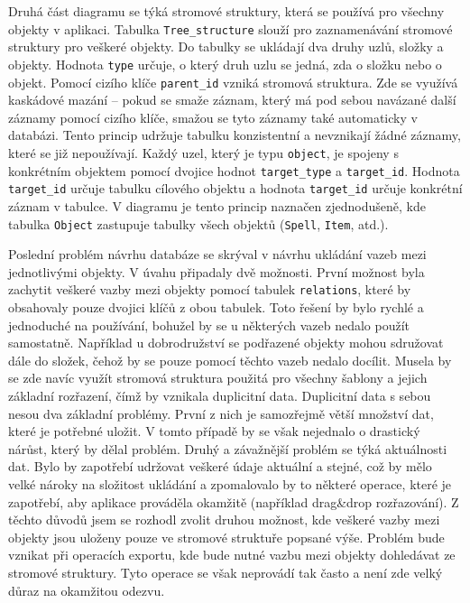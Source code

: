 \documentclass[thesis=B,czech]{resources/FITthesis}[2012/06/26]
\begin{document}
Druhá část diagramu se týká stromové struktury, která se používá pro všechny objekty v aplikaci. Tabulka \texttt{Tree\_structure} slouží pro zaznamenávání stromové struktury pro veškeré objekty. Do tabulky se ukládají dva druhy uzlů, složky a objekty. Hodnota \texttt{type} určuje, o který druh uzlu se jedná, zda o složku nebo o objekt. Pomocí cizího klíče \texttt{parent\_id} vzniká stromová struktura. Zde se využívá kaskádové mazání -- pokud se smaže záznam, který má pod sebou navázané další záznamy pomocí cizího klíče, smažou se tyto záznamy také automaticky v databázi. Tento princip udržuje tabulku konzistentní a nevznikají žádné záznamy, které se již nepoužívají. Každý uzel, který je typu \texttt{object}, je spojeny s konkrétním objektem pomocí dvojice hodnot \texttt{target\_type} a \texttt{target\_id}. Hodnota \texttt{target\_id} určuje tabulku cílového objektu a hodnota \texttt{target\_id} určuje konkrétní záznam v tabulce. V diagramu je tento princip naznačen zjednodušeně, kde tabulka \texttt{Object} zastupuje tabulky všech objektů (\texttt{Spell}, \texttt{Item}, atd.). \par

Poslední problém návrhu databáze se skrýval v návrhu ukládání vazeb mezi jednotlivými objekty. V úvahu připadaly dvě možnosti. První možnost byla zachytit veškeré vazby mezi objekty pomocí tabulek \texttt{relations}, které by obsahovaly pouze dvojici klíčů z obou tabulek. Toto řešení by bylo rychlé a jednoduché na používání, bohužel by se u některých vazeb nedalo použít samostatně. Například u dobrodružství se podřazené objekty mohou sdružovat dále do složek, čehož by se pouze pomocí těchto vazeb nedalo docílit. Musela by se zde navíc využít stromová struktura použitá pro všechny šablony a jejich základní rozřazení, čímž by vznikala duplicitní data. Duplicitní data s sebou nesou dva základní problémy. První z nich je samozřejmě větší množství dat, které je potřebné uložit. V tomto případě by se však nejednalo o drastický nárůst, který by dělal problém. Druhý a závažnější problém se týká aktuálnosti dat. Bylo by zapotřebí udržovat veškeré údaje aktuální a stejné, což by mělo velké nároky na složitost ukládání a zpomalovalo by to některé operace, které je zapotřebí, aby aplikace prováděla okamžitě (například drag\&drop rozřazování). Z těchto důvodů jsem se rozhodl zvolit druhou možnost, kde veškeré vazby mezi objekty jsou uloženy pouze ve stromové struktuře popsané výše. Problém bude vznikat při operacích exportu, kde bude nutné vazbu mezi objekty dohledávat ze stromové struktury. Tyto operace se však neprovádí tak často a není zde velký důraz na okamžitou odezvu. 
\end{document}
